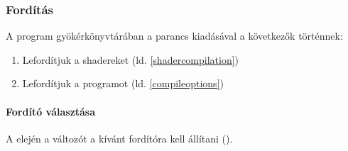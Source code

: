 \subsubsection{Ford\'it\'as}
A program gy\"ok\'erk\"onyvt\'ar\'aban a  parancs kiad\'as\'aval a k\"ovetkez\H ok t\"ort\'ennek:
\begin{enumerate}
	\item Leford\'itjuk a shadereket (ld. \ref{shadercompilation})
	\item Leford\'itjuk a programot (ld. \ref{compileoptions})
\end{enumerate}

\paragraph{Ford\'it\'o v\'alaszt\'asa}
A  elej\'en a  v\'altoz\'ot a k\'iv\'ant ford\'it\'ora kell \'all\'itani ().
